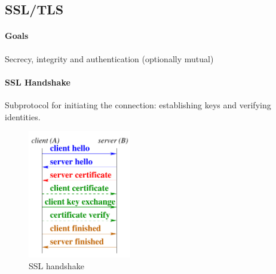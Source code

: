 \newpage
\subsection{SSL/TLS}

\paragraph{Goals} Secrecy, integrity and authentication (optionally mutual)

\paragraph{SSL Handshake} Subprotocol for initiating the connection: establishing keys and verifying identities.

\begin{figure}[h]
    \centering
    \includegraphics[width=4.5cm]{images/ch9-ssl-handshake.png}
    \caption{SSL handshake}
    \label{fig:ssl-handshake}
\end{figure}

